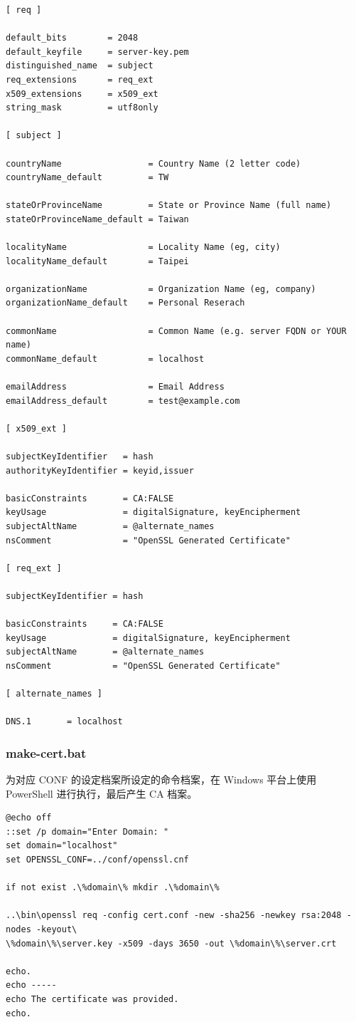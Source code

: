 \begin{Verbatim}
[ req ]

default_bits        = 2048
default_keyfile     = server-key.pem
distinguished_name  = subject
req_extensions      = req_ext
x509_extensions     = x509_ext
string_mask         = utf8only

[ subject ]

countryName                 = Country Name (2 letter code)
countryName_default         = TW

stateOrProvinceName         = State or Province Name (full name)
stateOrProvinceName_default = Taiwan

localityName                = Locality Name (eg, city)
localityName_default        = Taipei

organizationName            = Organization Name (eg, company)
organizationName_default    = Personal Reserach

commonName                  = Common Name (e.g. server FQDN or YOUR name)
commonName_default          = localhost

emailAddress                = Email Address
emailAddress_default        = test@example.com

[ x509_ext ]

subjectKeyIdentifier   = hash
authorityKeyIdentifier = keyid,issuer

basicConstraints       = CA:FALSE
keyUsage               = digitalSignature, keyEncipherment
subjectAltName         = @alternate_names
nsComment              = "OpenSSL Generated Certificate"

[ req_ext ]

subjectKeyIdentifier = hash

basicConstraints     = CA:FALSE
keyUsage             = digitalSignature, keyEncipherment
subjectAltName       = @alternate_names
nsComment            = "OpenSSL Generated Certificate"

[ alternate_names ]

DNS.1       = localhost
\end{Verbatim}

\subsubsection{make-cert.bat}

为对应 CONF 的设定档案所设定的命令档案，在 Windows 平台上使用 PowerShell 进行执行，最后产生 CA 档案。

\begin{Verbatim}
@echo off
::set /p domain="Enter Domain: "
set domain="localhost"
set OPENSSL_CONF=../conf/openssl.cnf

if not exist .\%domain\% mkdir .\%domain\%

..\bin\openssl req -config cert.conf -new -sha256 -newkey rsa:2048 -nodes -keyout\
\%domain\%\server.key -x509 -days 3650 -out \%domain\%\server.crt

echo.
echo -----
echo The certificate was provided.
echo.
\end{Verbatim}

